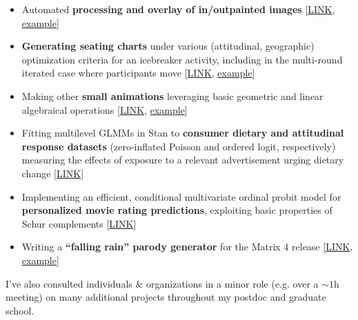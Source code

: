 \documentclass[12pt]{article}
\begin{document}
\begin{itemize}[noitemsep]
\item Automated \textbf{processing and overlay of in/outpainted images} [\href{https://github.com/NikVetr/minor\_scripts/blob/c8926965b0c6dd9158351cf5836cbc76261f6830/postdoc/dall-e2\_zoomout.R}{LINK}, \href{https://drive.google.com/file/d/1nuvGY8d3h9qYeh9NrWVbo9ybkt0RdORn}{example}]

\item \textbf{Generating seating charts} under various (attitudinal, geographic) optimization criteria for an icebreaker activity, including in the multi-round iterated case where participants move [\href{https://github.com/NikVetr/minor\_scripts/blob/c8926965b0c6dd9158351cf5836cbc76261f6830/postdoc/optimal_table_seating.R}{LINK}, \href{https://drive.google.com/file/d/1z-D3m9fd-hYQmAHGoDBl3N--k-udfTLb/view?usp=drive\_link}{example}]

\item Making other \textbf{small animations} leveraging basic geometric and linear algebraical operations [\href{https://github.com/NikVetr/minor\_scripts/blob/c8926965b0c6dd9158351cf5836cbc76261f6830/postdoc/polygon\_animation.r}{LINK}, \href{https://drive.google.com/file/d/1BCUmNXSr2ST00JxM32t7qBhQXMZEZERv}{example}]

\item Fitting multilevel GLMMs in Stan to \textbf{consumer dietary and attitudinal response datasets} (zero-inflated Poisson and ordered logit, respectively) measuring the effects of exposure to a relevant advertisement urging dietary change [\href{https://github.com/NikVetr/side\_projects/blob/24f7e38876a95433364123441f9b41d260105be6/MFA_Ads.R}{LINK}]

\item Implementing an efficient, conditional multivariate ordinal probit model for \textbf{personalized movie rating predictions}, exploiting basic properties of Schur complements [\href{https://github.com/NikVetr/side\_projects/blob/24f7e38876a95433364123441f9b41d260105be6/movieRatingPersonalization.R}{LINK}]

\item Writing a \textbf{``falling rain'' parody generator} for the Matrix 4 release [\href{https://github.com/NikVetr/montgomery\_lab/blob/61e2ac4b0fea0ee7f5bf31590a40378f0027264a/Matrix\_GreenRain.R#L4}{LINK},  \href{https://drive.google.com/file/d/1hwzzLq9xTpAc2AvFyLTy-L\_ZHG\_VlIK\_}{example}]


\end{itemize}

I've also consulted individuals \& organizations in a minor role (e.g. over a $\sim 1$h meeting) on many additional projects throughout my postdoc and graduate school.
\end{document}
